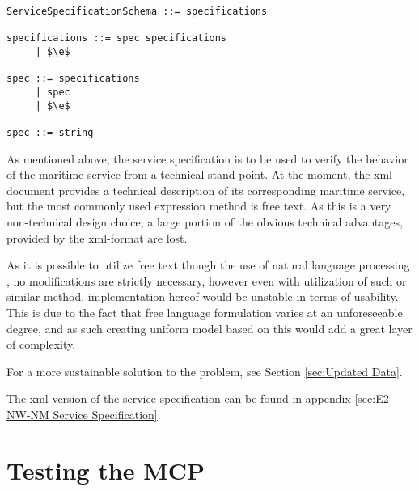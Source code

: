 \begin{lstlisting}[keywordstyle={}, label={lst:sSpecRed}, caption={Reduced parser grammar of Service Specification Schema}]
ServiceSpecificationSchema ::= specifications

specifications ::= spec specifications
     | $\e$
     
spec ::= specifications
     | spec
     | $\e$

spec ::= string
\end{lstlisting}

As mentioned above, the service specification is to be used to verify the behavior of the maritime service from a technical stand point. At the moment, the xml-document provides a technical description of its corresponding maritime service, but the most commonly used expression method is free text. As this is a very non-technical design choice, a large portion of the obvious technical advantages, provided by the xml-format are lost. 

As it is possible to utilize free text though the use of natural language processing \cite{nlp}, no modifications are strictly necessary, however even with utilization of such or similar method, implementation hereof would be unstable in terms of usability. This is due to the fact that free language formulation varies at an unforeseeable degree, and as such creating uniform model based on this would add a great layer of complexity.

For a more sustainable solution to the problem, see Section \ref{sec:Updated Data}.

The xml-version of the service specification can be found in appendix \ref{sec:E2 - NW-NM Service Specification}.

\section{Testing the MCP} %

